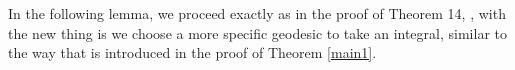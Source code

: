 \documentclass[11pt]{amsart}
\newtheorem{lemma}[theorem]{Lemma}
\begin{document}
    



In the following lemma, we proceed exactly as in the proof of Theorem 14, \cite{bakryqian}, with the new thing is we choose a more specific geodesic to take an integral, similar to the way that is introduced in the proof of Theorem \ref{main1}.
\end{document}
